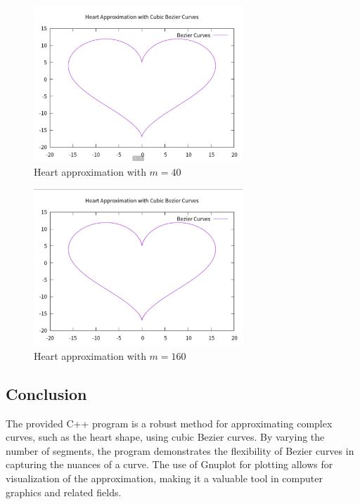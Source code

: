 \documentclass{article}
\begin{document}
\begin{figure}[H]
    \centering
    \includegraphics[width=0.7\textwidth]{40.png}
    \caption{Heart approximation with \(m = 40\)}
    \label{fig:heart40}
\end{figure}

\begin{figure}[H]
    \centering
    \includegraphics[width=0.7\textwidth]{160.png}
    \caption{Heart approximation with \(m = 160\)}
    \label{fig:heart160}
\end{figure}

\subsection{Conclusion}
The provided C++ program is a robust method for approximating complex curves, such as the heart shape, using cubic Bezier curves. By varying the number of segments, the program demonstrates the flexibility of Bezier curves in capturing the nuances of a curve. The use of Gnuplot for plotting allows for visualization of the approximation, making it a valuable tool in computer graphics and related fields.
\end{document}

